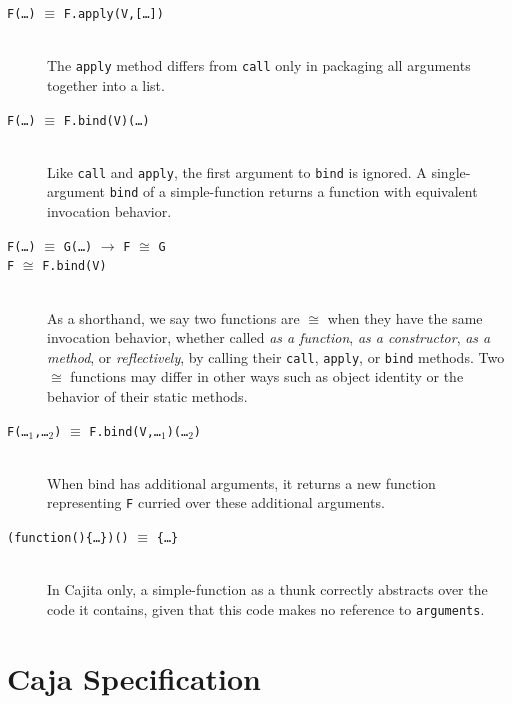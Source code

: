 \documentclass[letterpaper,twocolumn,10pt]{article}
\newcommand{\code}[1]{{\tt {#1}}}              %
\begin{document}
\begin{description}
  \item[\code{F(\ldots)} $\equiv$ \code{F.apply(V,[\ldots])}]
  
  \ \\
  The \code{apply} method differs from \code{call} only in packaging all 
  arguments together into a list.
  
  \item[\code{F(\ldots)} $\equiv$ \code{F.bind(V)(\ldots)}]

  \ \\
  Like \code{call} and \code{apply}, the first argument to \code{bind} is 
  ignored. A single-argument \code{bind} of a simple-function returns a 
  function with equivalent invocation behavior.
  
  \item[\code{F(\ldots)} $\equiv$ \code{G(\ldots)} $\rightarrow$ 
  \code{F} $\cong$ \code{G}]

  \item[\code{F} $\cong$ \code{F.bind(V)}]
    
  \ \\
  As a shorthand, we say two functions are $\cong$ when they have the same 
  invocation behavior, whether called \emph{as a function}, \emph{as a 
  constructor}, \emph{as a method}, or \emph{reflectively}, by calling their 
  \code{call}, \code{apply}, or \code{bind} methods. Two $\cong$ functions 
  may differ in other ways such as object identity or the behavior of their 
  static methods.
    
  \item[\code{F(\ldots$_1$,\ldots$_2$)} $\equiv$ 
  \code{F.bind(V,\ldots$_1$)(\ldots$_2$)}]

  \ \\
  When bind has additional arguments, it returns a new function representing 
  \code{F} curried over these additional arguments.
  
  \item[\code{(function()\{{\ldots\}})()} $\equiv$ \code{\{{\ldots}\}}]
  
  \ \\
  In Cajita only, a simple-function as a thunk correctly abstracts over the 
  code it contains, given that this code makes no reference to 
  \code{arguments}.
  
\end{description}


\section{Caja Specification}
\label{sec:caja-spec}
\end{document}
